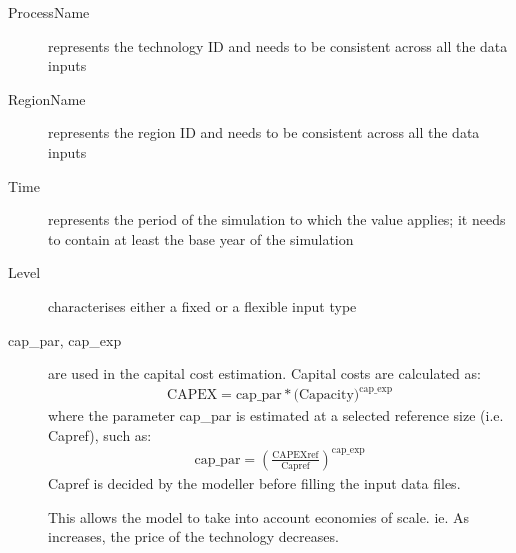 \documentclass[letterpaper,10pt,english]{sphinxmanual}
\begin{document}
\begin{description}
\item[{ProcessName}] \leavevmode
represents the technology ID and needs to be consistent across all the data inputs

\item[{RegionName}] \leavevmode
represents the region ID and needs to be consistent across all the data inputs

\item[{Time}] \leavevmode
represents the period of the simulation to which the value applies; it needs to
contain at least the base year of the simulation

\item[{Level}] \leavevmode
characterises either a fixed or a flexible input type

\item[{cap\_par, cap\_exp}] \leavevmode
are used in the capital cost estimation. Capital costs are calculated as:
\begin{equation*}
\begin{split}\text{CAPEX} = \text{cap\_par} * \text{(Capacity)}^\text{cap\_exp}\end{split}
\end{equation*}
where the parameter cap\_par is estimated at a selected reference size (i.e. Capref),
such as:
\begin{equation*}
\begin{split}\text{cap\_par} = \left(
   \frac{\text{CAPEXref}}{\text{Capref}}
\right)^{\text{cap\_exp}}\end{split}
\end{equation*}
Capref is decided by the modeller before filling the input data files.

This allows the model to take into account economies of scale. ie. As  increases, the price of the technology decreases.

\end{description}
\end{document}
